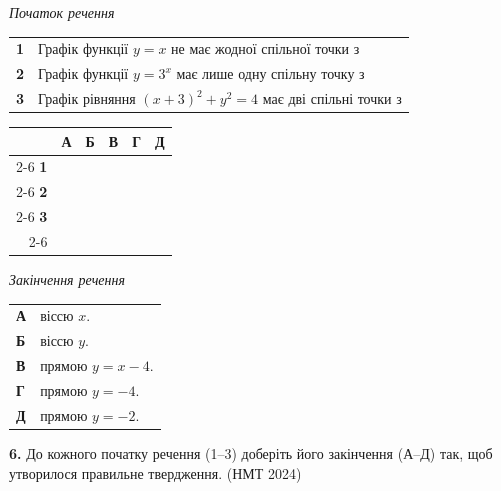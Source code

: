 \documentclass[14pt]{extarticle}
\newcommand{\answerGrid}{
    \begingroup
    \setlength{\tabcolsep}{4pt}
    \renewcommand{\arraystretch}{1.2}
    \small
    \begin{tabular}{r|c|c|c|c|c|}
         \multicolumn{1}{c}{} & \multicolumn{1}{c}{\textbf{А}} & \multicolumn{1}{c}{\textbf{Б}} & \multicolumn{1}{c}{\textbf{В}} & \multicolumn{1}{c}{\textbf{Г}} & \multicolumn{1}{c}{\textbf{Д}} \\ \cline{2-6}
         \textbf{1} & & & & & \\ \cline{2-6}
         \textbf{2} & & & & & \\ \cline{2-6}
         \textbf{3} & & & & & \\ \cline{2-6}
    \end{tabular}
    \endgroup
}
\newcommand{\nmtyear}[1]{\hfill{\small\color{yearcolor}(НМТ #1)}}
\begin{document}
\noindent
\begin{minipage}[t]{0.60\textwidth}
    \textit{Початок речення} \par \vspace{0.2cm}
    \begin{tabular}{@{}p{0.5cm} p{9cm}@{}}
    \textbf{1} & Графік функції $y = x$ не має жодної спільної точки з \\[0.2cm]
    \textbf{2} & Графік функції \colorbox{yellow!30}{$y = 3^x$} має лише одну спільну точку з \\[0.2cm]
    \textbf{3} & Графік рівняння $(x + 3)^2 + y^2 = 4$ має дві спільні точки з \\
    \end{tabular}
    
    \vspace{0.3cm}
    \answerGrid
\end{minipage}%
\hfill
\begin{minipage}[t]{0.35\textwidth}
    \textit{Закінчення речення} \par \vspace{0.2cm}
    \begin{tabular}{@{}p{0.5cm} l@{}}
    \textbf{А} & віссю $x$. \\[0.2cm]
    \textbf{Б} & віссю $y$. \\[0.2cm]
    \textbf{В} & прямою $y = x - 4$. \\[0.2cm]
    \textbf{Г} & прямою $y = -4$. \\[0.2cm]
    \textbf{Д} & прямою $y = -2$. \\
    \end{tabular}
\end{minipage}
\vspace{0.7cm}

\noindent\textbf{6.} До кожного початку речення (1–3) доберіть його закінчення (А–Д) так, щоб утворилося правильне твердження. \nmtyear{2024}
\vspace{0.3cm}
\end{document}
